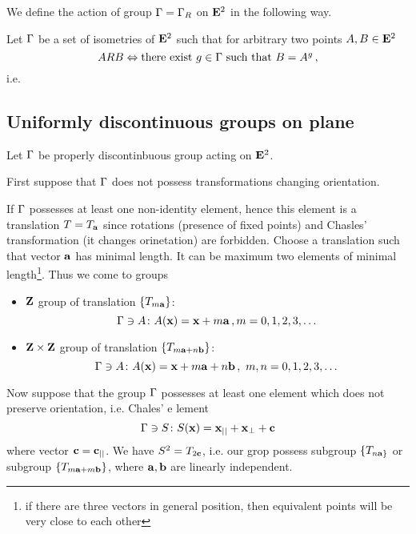 \documentclass[12pt]{article}
\theoremstyle{theorem}
\theoremstyle{lemma}
\numberwithin{equation}{section}
\begin{document}
  We define the action of group ${\Gamma}={\Gamma}_R$ on ${\bf E}^2$
in the following way.



 Let ${\Gamma}$ be a set of isometries of ${\bf E}^2$ such that
for arbitrary two points $A,B\in {\bf E}^2$
      \begin{equation*}
      ARB \Leftrightarrow 
      \hbox{there exist $g\in {\Gamma}$ such that $B=A^g$}\,,
\end{equation*}
i.e. 

\subsection {Uniformly discontinuous groups on plane}

  Let ${\Gamma}$ be properly discontinbuous group acting on  ${\bf E}^2$.

First suppose that
 ${\Gamma}$ does not possess transformations changing orientation.

If ${\Gamma}$ possesses at least one non-identity element, hence
this element is a translation $T=T_{\bf a}$ since rotations
(presence of fixed points) and Chasles' transformation
 (it changes  orinetation)
are forbidden.   Choose a translation such that vector ${\bf a}$
has minimal length. It can be maximum two elements of minimal
length\footnote{if there are three vectors in general position,
then equivalent points will be very close to each other}. 
Thus we come to groups

  \begin{itemize}
     \item
   ${\bf Z}$ group of translation $\{T_{m{\bf a}}\}$:
           \begin{equation*}
           {\Gamma}\ni A\colon A({\bf x})={\bf x}+m{\bf a}\,, m=0,1,2,3,\dots
           \end{equation*}
     \item
   ${\bf Z}\times {\bf Z}$ group of translation $\{T_{m{\bf a}+n{\bf b}}\}$:
           \begin{equation*}
           {\Gamma}\ni A\colon A({\bf x})={\bf x}+m{\bf a}+n{\bf b}\,,\,\, m,n=0,1,2,3,
\dots
           \end{equation*}
\end{itemize}

Now suppose that the group ${\Gamma}$ possesses at least one
element which does not preserve orientation, i.e.  Chales' e
lement
           \begin{equation}\label{chasles1}
           {\Gamma}\ni S\colon S({\bf x})={\bf x}_{||}+{\bf x}_\perp+{\bf c }
           \end{equation}
where vector ${\bf c }={\bf c }_{||}$. We have $S^2=T_{2{\bf c }}$,
i.e. our grop possess subgroup $\{T_{n{\bf a}\}}$
or subgroup $\{T_{m{\bf a}+m{\bf b}}\}$, where ${\bf a},{\bf b}$
are linearly independent.
\end{document}

